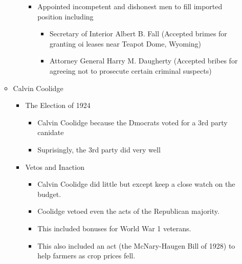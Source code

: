 \documentclass[12pt]{article} %
\begin{document}
\begin{enumerate}
\begin{itemize}
\begin{itemize}
\begin{itemize}
				\item Appointed incompetent and dishonest men to fill imported position including
				\begin{itemize}
					\item Secretary of Interior Albert B. Fall (Accepted brimes for granting oi leases near Teapot Dome, Wyoming)
					\item Attorney General Harry M. Daugherty (Accepted bribes for agreeing not to prosecute certain criminal suspects)
				\end{itemize}
			\end{itemize}
		\end{itemize}
		\item Calvin Coolidge
		\begin{itemize}
			\item The Election of 1924
			\begin{itemize}
				\item Calvin Coolidge because the Dmocrats voted for a 3rd party canidate
				\item Suprisingly, the 3rd party did very well
			\end{itemize}
			\item Vetos and Inaction
			\begin{itemize}
				\item Calvin Coolidge did little but except keep a close watch on the budget.
				\item Coolidge vetoed even the acts of the Republican majority.
				\item This included bonuses for World War 1 veterans.
				\item This also included an act (the McNary-Haugen Bill of 1928) to help 
					farmers as crop prices fell.
			\end{itemize}
		\end{itemize}
	\end{itemize}
\end{enumerate}
\end{document}
